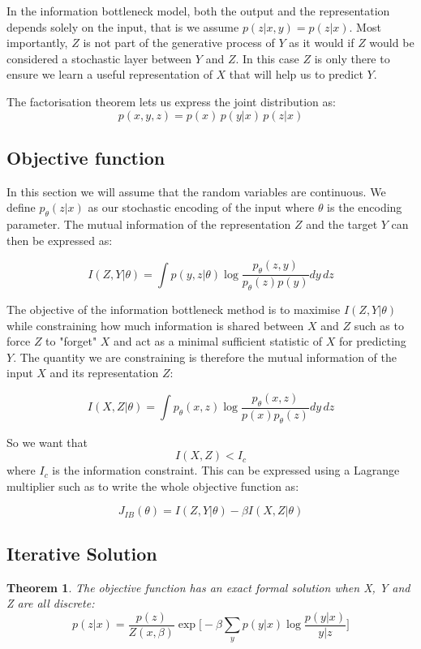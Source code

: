 \documentclass[10pt,oneside,openright]{report}
\newtheorem{theorem}{Theorem}
\begin{document}
In the information bottleneck model, both the output and the representation depends solely on the input, that is we assume $p(z | x, y) = p(z|x)$. Most importantly, $Z$ is not part of the generative process of $Y$ as it would if $Z$ would be considered a stochastic layer between $Y$ and $Z$. In this case $Z$ is only there to ensure we learn a useful representation of $X$ that will help us to predict $Y$.

The factorisation theorem lets us express the joint distribution as:
$$ p(x, y, z) = p(x)\, p(y|x)\, p(z|x)$$

\subsection{Objective function}
In this section we will assume that the random variables are continuous. We define $p_\theta(z|x)$ as our stochastic encoding of the input where $\theta$ is the encoding parameter. The mutual information of the representation $Z$ and the target $Y$ can then be expressed as:

$$ I(Z, Y|\theta) = \int p(y, z|\theta) \log \frac{p_\theta(z, y)}{p_\theta(z)p(y)} dy\,dz $$

The objective of the information bottleneck method is to maximise $I(Z, Y|\theta)$ while constraining how much information is shared between $X$ and $Z$ such as to force $Z$ to "forget" $X$ and act as a minimal sufficient statistic of $X$ for predicting $Y$. The quantity we are constraining is therefore the mutual information of the input $X$ and its representation $Z$:

$$ I(X, Z|\theta) = \int p_\theta(x, z) \log \frac{p_\theta(x, z)}{p(x)p_\theta(z)} dy\,dz $$

So we want that $$I(X, Z) < I_c$$ where $I_c$ is the information constraint. This can be expressed using a Lagrange multiplier such as to write the whole objective function as:

$$ J_{IB}(\theta) = I(Z, Y|\theta) - \beta I(X, Z|\theta)$$


\subsection{Iterative Solution}
\begin{theorem}
The objective function has an exact formal solution when X, Y and Z are all discrete:
$$ p(z|x) = \frac{p(z)}{Z(x, \beta)} \exp\Big[-\beta \sum_y p(y|x) \log\frac{p(y|x)}{y|z}\Big] $$
\end{theorem}
\end{document}

